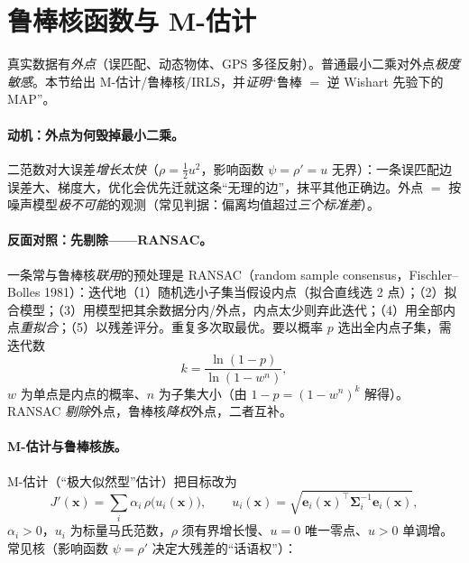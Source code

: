 \section{鲁棒核函数与 M-估计}
\label{sec:nlopt-robust}

真实数据有\emph{外点}（误匹配、动态物体、GPS 多径反射）。普通最小二乘对外点\emph{极度敏感}。本节给出 M-估计/鲁棒核/IRLS，并\emph{证明}“鲁棒 $=$ 逆 Wishart 先验下的 MAP”。

\paragraph{动机：外点为何毁掉最小二乘。}\cite{gaoxiang2019slam14,barfoot2024state}
二范数对大误差\emph{增长太快}（$\rho=\tfrac12u^2$，影响函数 $\psi=\rho'=u$ 无界）：一条误匹配边误差大、梯度大，优化会优先迁就这条“无理的边”，抹平其他正确边。外点 $=$ 按噪声模型\emph{极不可能}的观测（常见判据：偏离均值超过\emph{三个标准差}）\cite{barfoot2024state}。

\paragraph{反面对照：先剔除——RANSAC。}\cite{barfoot2024state}
一条常与鲁棒核\emph{联用}的预处理是 RANSAC（random sample consensus，Fischler--Bolles 1981）：迭代地（1）随机选小子集当假设内点（拟合直线选 2 点）；（2）拟合模型；（3）用模型把其余数据分内/外点，内点太少则弃此迭代；（4）用全部内点\emph{重拟合}；（5）以残差评分。重复多次取最优。要以概率 $p$ 选出全内点子集，需迭代数
\begin{equation}
  k=\frac{\ln(1-p)}{\ln(1-w^n)},
  \label{eq:nlopt-ransac}
\end{equation}
$w$ 为单点是内点的概率、$n$ 为子集大小（由 $1-p=(1-w^n)^k$ 解得）。RANSAC \emph{剔除}外点，鲁棒核\emph{降权}外点，二者互补。

\paragraph{M-估计与鲁棒核族。}\cite{barfoot2024state,gaoxiang2019slam14}
M-估计（“极大似然型”估计）把目标改为
\begin{equation}
  J'(\mathbf{x})=\sum_i\alpha_i\,\rho\big(u_i(\mathbf{x})\big),\qquad u_i(\mathbf{x})=\sqrt{\mathbf{e}_i(\mathbf{x})^\top\boldsymbol{\Sigma}_i^{-1}\mathbf{e}_i(\mathbf{x})},
  \label{eq:nlopt-mestim}
\end{equation}
$\alpha_i>0$，$u_i$ 为标量马氏范数，$\rho$ 须有界增长慢、$u=0$ 唯一零点、$u>0$ 单调增。常见核（影响函数 $\psi=\rho'$ 决定大残差的“话语权”）：

